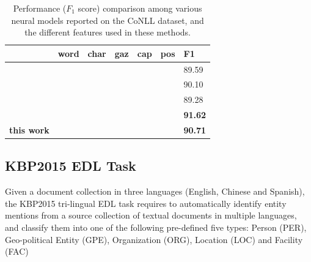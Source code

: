 \documentclass[11pt,a4paper]{article}
\newcommand{\cmark}{\ding{51}}
\newcommand{\xmark}{\ding{55}}
\begin{document}
\begin{table}[h!]
	\centering
	\begin{tabular}{|l|lllll|l|}
		\hline
		& word & char & gaz & cap & pos & F1 \\
		\hline\hline
		\cite{collobert2011natural} & \cmark & \xmark & \cmark & \cmark & \xmark & 89.59  \\
		\cite{huang2015bidirectional} &\cmark & \cmark & \cmark & \cmark & \cmark & 90.10 \\
		\cite{rondeau2016lstm}  & \cmark & \xmark & \cmark & \cmark & \cmark & 89.28 \\
		\cite{chiu2016named} & \cmark & \cmark & \cmark & \xmark & \xmark & {\bf 91.62} \\
		\hline \hline
		{\bf this work} & \cmark & \cmark & \xmark & \xmark & \xmark & {\bf 90.71} \\
		\hline
	\end{tabular}
	\caption{Performance ($F_1$ score) comparison among various neural models reported on the CoNLL dataset, and the different features used in these methods.}
	\label{tbl:nn-cmp:CoNLL03}
\end{table}


\subsection{KBP2015 EDL Task}

Given a document collection in three languages (English, Chinese and Spanish), the KBP2015 tri-lingual EDL task \cite{kbpoverview2015} requires to automatically identify entity mentions from a
source collection of textual documents in multiple
languages, and classify them into one of the following pre-defined
five types: Person (PER), Geo-political Entity
(GPE), Organization (ORG), Location (LOC)
and Facility (FAC)

\begin{table}
	\caption{Entity Discovery Performance of our method on the KBP2015 EDL evaluation data, with comparison to the best system in KBP2015 official evaluation.}
	\label{Table_KBP2015_ED}
\end{table}
\end{document}
